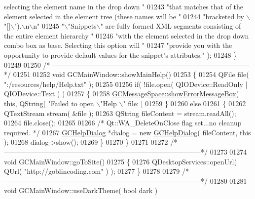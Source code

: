 \begin{DoxyCode}
{{{{{{{       selecting the element name in the drop down "}
01243                             \textcolor{stringliteral}{"that matches that of the element selected in the
       element tree (these names will be "}
01244                             \textcolor{stringliteral}{"bracketed by \(\backslash\)"[]\(\backslash\)").\(\backslash\)n\(\backslash\)n"}
01245                             \textcolor{stringliteral}{"\(\backslash\)"Snippets\(\backslash\)" are fully formed XML segments
       consisting of the entire element hierarchy "}
01246                             \textcolor{stringliteral}{"with the element selected in the drop down combo
       box as base. Selecting this option will "}
01247                             \textcolor{stringliteral}{"provide you with the opportunity to provide
       default values for the snippet's attributes."} );
01248 \}
01249 
01250 \textcolor{comment}{/*
      --------------------------------------------------------------------------------------*/}
01251 
01252 \textcolor{keywordtype}{void} GCMainWindow::showMainHelp()
01253 \{
01254   QFile file( \textcolor{stringliteral}{":/resources/help/Help.txt"} );
01255 
01256   \textcolor{keywordflow}{if}( !file.open( QIODevice::ReadOnly | QIODevice::Text ) )
01257   \{
01258     \hyperlink{namespace_g_c_message_space_ab118b3a133686167617eb955029fd44e}{GCMessageSpace::showErrorMessageBox}( \textcolor{keyword}{this}, QString( \textcolor{stringliteral}{"Failed to open \(\backslash\)"Help
      \(\backslash\)" file: [%
01259   \}
01260   \textcolor{keywordflow}{else}
01261   \{
01262     QTextStream stream( &file );
01263     QString fileContent = stream.readAll();
01264     file.close();
01265 
01266     \textcolor{comment}{/* Qt::WA\_DeleteOnClose flag set...no cleanup required. */}
01267     \hyperlink{class_g_c_help_dialog}{GCHelpDialog} *dialog = \textcolor{keyword}{new} \hyperlink{class_g_c_help_dialog}{GCHelpDialog}( fileContent, \textcolor{keyword}{this} );
01268     dialog->show();
01269   \}
01270 \}
01271 
01272 \textcolor{comment}{/*
      --------------------------------------------------------------------------------------*/}
01273 
01274 \textcolor{keywordtype}{void} GCMainWindow::goToSite()
01275 \{
01276   QDesktopServices::openUrl( QUrl( \textcolor{stringliteral}{"http://goblincoding.com"} ) );
01277 \}
01278 
01279 \textcolor{comment}{/*
      --------------------------------------------------------------------------------------*/}
01280 
01281 \textcolor{keywordtype}{void} GCMainWindow::useDarkTheme( \textcolor{keywordtype}{bool} dark )
}}}}}}}
\end{DoxyCode}
